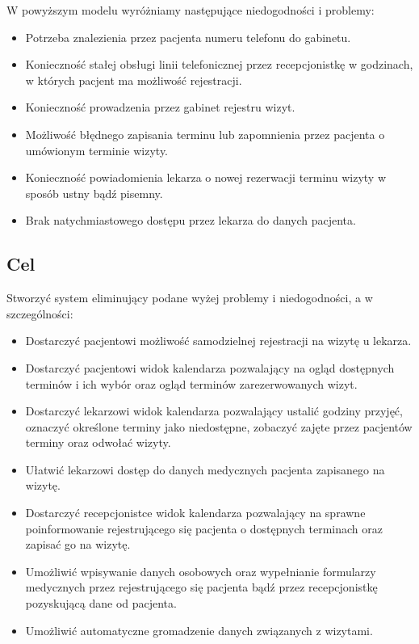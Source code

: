 \documentclass[polish,12pt]{aghthesis}
\begin{document}
W powyższym modelu wyróżniamy następujące niedogodności i problemy:
\begin{itemize}
  \item Potrzeba znalezienia przez pacjenta numeru telefonu do gabinetu.
  \item Konieczność stałej obsługi linii telefonicznej przez recepcjonistkę w godzinach, w których pacjent ma możliwość rejestracji.
  \item Konieczność prowadzenia przez gabinet rejestru wizyt.
  \item Możliwość błędnego zapisania terminu lub zapomnienia przez pacjenta o umówionym terminie wizyty.
  \item Konieczność powiadomienia lekarza o nowej rezerwacji terminu wizyty w sposób ustny bądź pisemny.
  \item Brak natychmiastowego dostępu przez lekarza do danych pacjenta.
\end{itemize}

\subsection{Cel}
Stworzyć system eliminujący podane wyżej problemy i niedogodności, a w szczególności:

\begin{itemize}
  \item Dostarczyć pacjentowi możliwość samodzielnej rejestracji na wizytę u lekarza.
  \item Dostarczyć pacjentowi widok kalendarza pozwalający na ogląd dostępnych terminów i ich wybór oraz ogląd terminów zarezerwowanych wizyt.
  \item Dostarczyć lekarzowi widok kalendarza pozwalający ustalić godziny przyjęć, oznaczyć określone terminy jako niedostępne, zobaczyć zajęte przez pacjentów terminy oraz odwołać wizyty.
  \item Ułatwić lekarzowi dostęp do danych medycznych pacjenta zapisanego na wizytę.
  \item Dostarczyć recepcjonistce widok kalendarza pozwalający na sprawne poinformowanie rejestrującego się pacjenta o dostępnych terminach oraz zapisać go na wizytę.
  \item Umożliwić wpisywanie danych osobowych oraz wypełnianie formularzy medycznych przez rejestrującego się pacjenta bądź przez recepcjonistkę pozyskującą dane od pacjenta.
  \item Umożliwić automatyczne gromadzenie danych związanych z wizytami.
\end{itemize}
\end{document}
